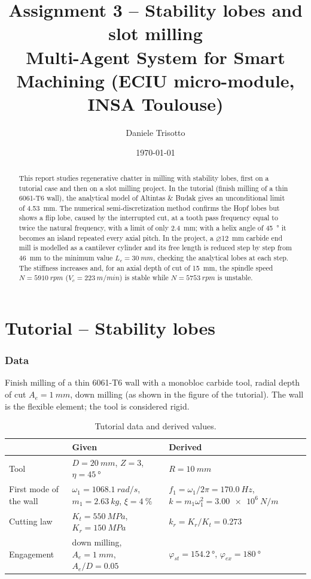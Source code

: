 \documentclass[11pt,a4paper]{article}
\title{\textbf{Assignment 3 -- Stability lobes and slot milling}\\[4pt]
\large Multi-Agent System for Smart Machining (ECIU micro-module, INSA Toulouse)}
\author{Daniele Trisotto}
\date{\today}
\begin{document}
\maketitle

\begin{abstract}
This report studies regenerative chatter in milling with stability lobes, first on a
tutorial case and then on a slot milling project.
In the tutorial (finish milling of a thin 6061-T6 wall), the analytical model of
Altintas \& Budak gives an unconditional limit of \SI{4.53}{mm}. The numerical
semi-discretization method confirms the Hopf lobes but shows a flip lobe, caused by the
interrupted cut, at a tooth pass frequency equal to twice the natural frequency, with a
limit of only \SI{2.4}{mm}; with a helix angle of \SI{45}{\degree} it becomes an island
repeated every axial pitch.
In the project, a $\varnothing$\SI{12}{mm} carbide end mill is modelled as a cantilever
cylinder and its free length is reduced step by step from \SI{46}{mm} to the minimum value
$L_c=\SI{30}{mm}$, checking the analytical lobes at each step. The stiffness increases and,
for an axial depth of cut of \SI{15}{mm}, the spindle speed $N=\SI{5910}{rpm}$
($V_c=\SI{223}{m/min}$) is stable while $N=\SI{5753}{rpm}$ is unstable.
\end{abstract}

\part*{Tutorial -- Stability lobes}
\section{Data}
Finish milling of a thin 6061-T6 wall with a monobloc carbide tool, radial depth of cut
$A_e=\SI{1}{mm}$, down milling (as shown in the figure of the tutorial). The wall is the
flexible element; the tool is considered rigid.

\begin{table}[H]
\centering
\caption{Tutorial data and derived values.}
\begin{tabular}{p{4.2cm}p{5.2cm}p{5.6cm}}
\toprule
 & Given & Derived \\
\midrule
Tool & $D=\SI{20}{mm}$, $Z=3$, $\eta=\SI{45}{\degree}$ & $R=\SI{10}{mm}$ \\
First mode of the wall & $\omega_1=\SI{1068.1}{rad/s}$, $m_1=\SI{2.63}{kg}$, $\xi=\SI{4}{\percent}$ &
$f_1=\omega_1/2\pi=\SI{170.0}{Hz}$, $k=m_1\omega_1^2=\SI{3.00e6}{N/m}$ \\
Cutting law & $K_t=\SI{550}{MPa}$, $K_r=\SI{150}{MPa}$ & $k_r=K_r/K_t=0.273$ \\
Engagement & down milling, $A_e=\SI{1}{mm}$, $A_e/D=0.05$ & $\varphi_{st}=\SI{154.2}{\degree}$, $\varphi_{ex}=\SI{180}{\degree}$ \\
\bottomrule
\end{tabular}
\end{table}
\end{document}
